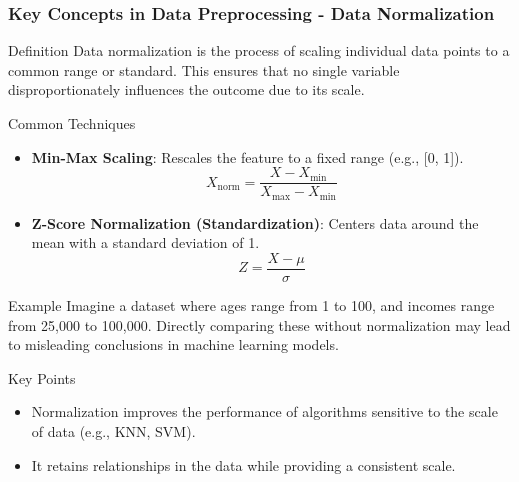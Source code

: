 \documentclass[aspectratio=169]{beamer}
\begin{document}
\begin{frame}[fragile]
    \frametitle{Key Concepts in Data Preprocessing - Data Normalization}
    \begin{block}{Definition}
        Data normalization is the process of scaling individual data points to a common range or standard. 
        This ensures that no single variable disproportionately influences the outcome due to its scale.
    \end{block}

    \begin{block}{Common Techniques}
        \begin{itemize}
            \item \textbf{Min-Max Scaling}: Rescales the feature to a fixed range (e.g., [0, 1]).
            \begin{equation}
                X_{\text{norm}} = \frac{X - X_{\text{min}}}{X_{\text{max}} - X_{\text{min}}}
            \end{equation}
            
            \item \textbf{Z-Score Normalization (Standardization)}: Centers data around the mean with a standard deviation of 1.
            \begin{equation}
                Z = \frac{X - \mu}{\sigma}
            \end{equation}
        \end{itemize}
    \end{block}

    \begin{block}{Example}
        Imagine a dataset where ages range from 1 to 100, and incomes range from 25,000 to 100,000. 
        Directly comparing these without normalization may lead to misleading conclusions in machine learning models.
    \end{block}

    \begin{block}{Key Points}
        \begin{itemize}
            \item Normalization improves the performance of algorithms sensitive to the scale of data (e.g., KNN, SVM).
            \item It retains relationships in the data while providing a consistent scale.
        \end{itemize}
    \end{block}
\end{frame}
\end{document}

